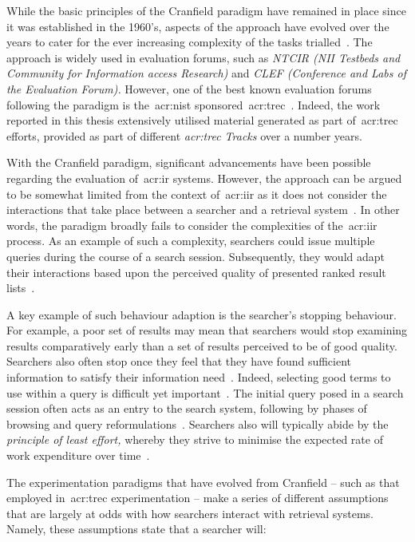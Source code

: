 While the basic principles of the Cranfield paradigm have remained in place since it was established in the 1960's, aspects of the approach have evolved over the years to cater for the ever increasing complexity of the tasks trialled~\citep{harman2010cranfield}. The approach is widely used in evaluation forums, such as \emph{NTCIR (NII Testbeds and Community for Information access Research)} and \emph{CLEF (Conference and Labs of the Evaluation Forum).} However, one of the best known evaluation forums following the paradigm is the~\gls{acr:nist} sponsored~\gls{acr:trec}~\citep{harman1993trec1}. Indeed, the work reported in this thesis extensively utilised material generated as part of~\gls{acr:trec} efforts, provided as part of different \emph{\gls{acr:trec} Tracks} over a number years.

With the Cranfield paradigm, significant advancements have been possible regarding the evaluation of~\gls{acr:ir} systems. However, the approach can be argued to be somewhat limited from the context of~\gls{acr:iir} as it does not consider the interactions that take place between a searcher and a retrieval system~\citep{borlund2000evaluation_iir, ingwersen2005theturn}. In other words, the paradigm broadly fails to consider the complexities of the~\gls{acr:iir} process. As an example of such a complexity, searchers could issue multiple queries during the course of a search session. Subsequently, they would adapt their interactions based upon the perceived quality of presented ranked result lists~\citep{moffat2013users_versus_models}.

A key example of such behaviour adaption is the searcher's stopping behaviour. For example, a poor set of results may mean that searchers would stop examining results comparatively early than a set of results perceived to be of good quality. Searchers also often stop once they feel that they have found sufficient information to satisfy their information need~\citep{zach2005enough_is_enough}. Indeed, selecting good terms to use within a query is difficult yet important~\citep{efthimiadis2000query_expansion}. The initial query posed in a search session often acts as an entry to the search system, following by phases of browsing and query reformulations~\citep{marchionini1993information_seeking}. Searchers also will typically abide by the \emph{principle of least effort,} whereby they strive to minimise the expected rate of work expenditure over time~\citep{zipf1949behaviour}.

The experimentation paradigms that have evolved from Cranfield -- such as that employed in~\gls{acr:trec} experimentation -- make a series of different assumptions that are largely at odds with how searchers interact with retrieval systems. Namely, these assumptions state that a searcher will:

